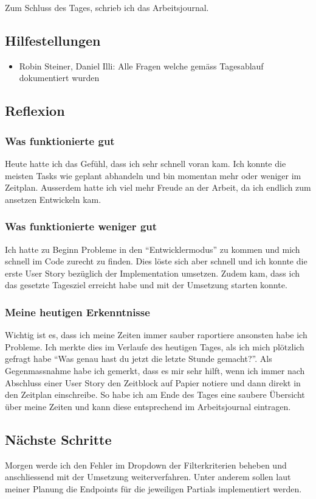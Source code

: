 Zum Schluss des Tages, schrieb ich das Arbeitsjournal.

\subsection*{Hilfestellungen}
\begin{itemize}
    \item Robin Steiner, Daniel Illi: Alle Fragen welche gemäss Tagesablauf dokumentiert wurden
\end{itemize}

\subsection*{Reflexion}

\subsubsection*{Was funktionierte gut}
Heute hatte ich das Gefühl, dass ich sehr schnell voran kam. Ich konnte die meisten Tasks wie geplant abhandeln und bin 
momentan mehr oder weniger im Zeitplan. Ausserdem hatte ich viel mehr Freude an der Arbeit, da ich endlich zum ansetzen Entwickeln kam.

\subsubsection*{Was funktionierte weniger gut}
Ich hatte zu Beginn Probleme in den ``Entwicklermodus'' zu kommen und mich schnell im Code zurecht zu finden.
Dies löste sich aber schnell und ich konnte die erste User Story bezüglich der Implementation umsetzen. Zudem kam, dass ich das 
gesetzte Tagesziel erreicht habe und mit der Umsetzung starten konnte.

\subsubsection*{Meine heutigen Erkenntnisse}
Wichtig ist es, dass ich meine Zeiten immer sauber raportiere ansonsten habe ich Probleme. Ich merkte dies im Verlaufe des heutigen Tages, als ich mich plötzlich gefragt habe ``Was genau hast du jetzt die letzte Stunde gemacht?''.
Als Gegenmassnahme habe ich gemerkt, dass es mir sehr hilft,
wenn ich immer nach Abschluss einer User Story den Zeitblock auf Papier notiere und dann direkt in den Zeitplan einschreibe. So habe ich am Ende 
des Tages eine saubere Übersicht über meine Zeiten und kann diese entsprechend im Arbeitsjournal eintragen.

\subsection*{Nächste Schritte}
Morgen werde ich den Fehler im Dropdown der Filterkriterien beheben und anschliessend mit der Umsetzung weiterverfahren. Unter anderem sollen laut
meiner Planung die Endpoints für die jeweiligen Partials implementiert werden.

\pagebreak
